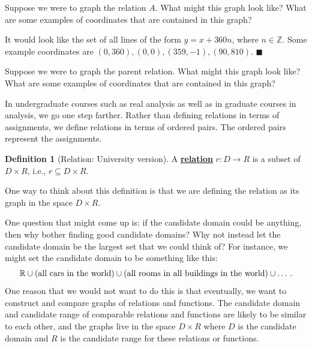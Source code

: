 \documentclass[11pt]{article}
\newenvironment{task}
	{\begin{mdframed}[linecolor=lightgray, linewidth=3pt]\raggedright}
	{\end{mdframed}}
\newcommand{\Z}{\mathbb{Z}}
\renewcommand\subset\subseteq
\renewcommand\emph[1]{\underline{\bf{#1}}} %
\theoremstyle{definition}
\newtheorem{definition}[theorem]{Definition}
\newenvironment{solution}{{\it Solution.} }{\hfill {\color{lightgray}$\blacksquare$}}
\begin{document}
\begin{task}
Suppose we were to graph the relation $A$. What might this graph look like? What are some examples of coordinates that are contained in this graph?
\end{task}

\begin{solution}
It would look like the set of all lines of the form $y=x+360n$, where $n\in \Z$. Some example coordinates are $(0, 360), (0,0), (359, -1), (90, 810)$.
\end{solution}

\begin{task}
Suppose we were to graph the parent relation. What might this graph look like? What are some examples of coordinates that are contained in this graph?
\end{task}

In undergraduate courses such as real analysis as well as in graduate courses in analysis, we go one step farther. Rather than defining relations in terms of assignments, we define relations in terms of ordered pairs. The ordered pairs represent the assignments. 

\begin{definition}[Relation: University version]\label{d: relation university}
A \emph{relation} $r:D\to R$ is a subset of $D\times R$, i.e., $r\subset D\times R$.
\end{definition}

One way to think about this definition is that we are defining the relation as its graph in the space $D\times R$. 

\begin{note}
One question that might come up is: if the candidate domain could be anything, then why bother finding good candidate domains? Why not instead let the candidate domain be the largest set that we could think of? For instance, we might set the candidate domain to be something like this:
$$\mathbb{R}\cup (\textnormal{all cars in the world}) \cup(\textnormal{all rooms in all buildings in the world})\cup \dots \,.$$ One reason that we would not want to do this is that eventually, we want to construct and compare graphs of relations and functions. The candidate domain and candidate range of comparable relations and functions are likely to be similar to each other, and the graphs live in the space $D\times R$ where $D$ is the candidate domain and $R$ is the candidate range for these relations or functions. \end{note}
\end{document}
